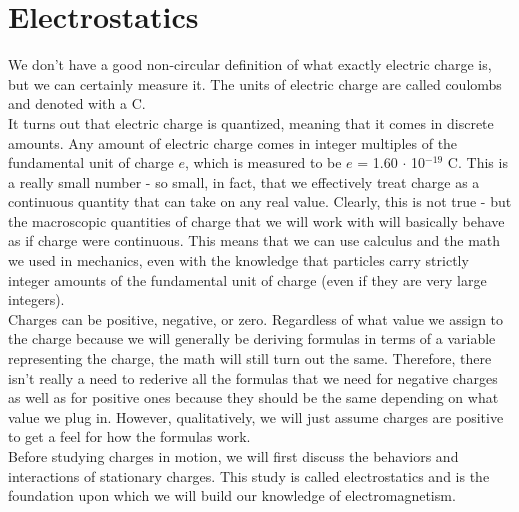 \section{Electrostatics}
We don't have a good non-circular definition of what exactly electric charge is, but we can certainly measure it. The units of electric charge are called coulombs and denoted with a C. \\
It turns out that electric charge is quantized, meaning that it comes in discrete amounts. Any amount of electric charge comes in integer multiples of the fundamental unit of charge $e$, which is measured to be $e$ = 1.60 $\cdot$ 10$^{-19}$ C. This is a really small number - so small, in fact, that we effectively treat charge as a continuous quantity that can take on any real value. Clearly, this is not true - but the macroscopic quantities of charge that we will work with will basically behave as if charge were continuous. This means that we can use calculus and the math we used in mechanics, even with the knowledge that particles carry strictly integer amounts of the fundamental unit of charge (even if they are very large integers). \\
Charges can be positive, negative, or zero. Regardless of what value we assign to the charge because we will generally be deriving formulas in terms of a variable representing the charge, the math will still turn out the same. Therefore, there isn't really a need to rederive all the formulas that we need for negative charges as well as for positive ones because they should be the same depending on what value we plug in. However, qualitatively, we will just assume charges are positive to get a feel for how the formulas work.\\
Before studying charges in motion, we will first discuss the behaviors and interactions of stationary charges. This study is called electrostatics and is the foundation upon which we will build our knowledge of electromagnetism. 

